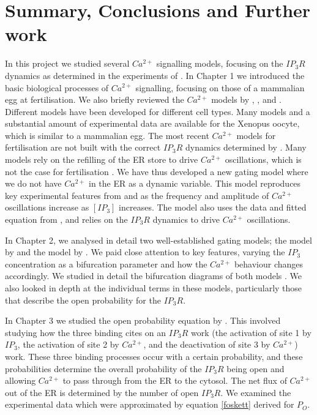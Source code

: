 \chapter{Summary, Conclusions and Further work}
In this project we studied several $Ca^{2+}$ signalling models, focusing on the $IP_3R$ dynamics as determined in the experiments of . In Chapter 1 we introduced the basic biological processes of $Ca^{2+}$ signalling, focusing on those of a mammalian egg at fertilisation. We also briefly reviewed the $Ca^{2+}$ models by , ,  and . Different models have been developed for different cell types. Many models and a substantial amount of experimental data are available for the Xenopus oocyte, which is similar to a mammalian egg. The most recent $Ca^{2+}$ models for fertilisation \cite{Theodoridou2013,Sanders2018,hofer} are not built with the correct $IP_3R$ dynamics determined by . Many models rely on the refilling of the ER store to drive $Ca^{2+}$ oscillations, which is not the case for fertilisation \cite{Sanders2018, wakai}. We have thus developed a new gating model where we do not have $Ca^{2+}$ in the ER as a dynamic variable. This model reproduces key experimental features from  and  as the frequency and amplitude of $Ca^{2+}$ oscillations increase as $[IP_3]$ increases. The model also uses the data and fitted equation from , and relies on the $IP_3R$ dynamics to drive $Ca^{2+}$ oscillations.  

In Chapter 2, we analysed in detail two well-established gating models; the model by  and the model by . We paid close attention to key features, varying the $IP_3$ concentration as a bifurcation parameter and how the $Ca^{2+}$ behaviour changes accordingly. We studied in detail the bifurcation diagrams of both models \cite{kaouri,lirinzel}. We also looked in depth at the individual terms in these models, particularly those that describe the open probability for the $IP_3R$.

In Chapter 3 we studied the open probability equation by . This involved studying how the three binding cites on an $IP_3R$ work (the activation of site 1 by $IP_3$, the activation of site 2 by $Ca^{2+}$, and the deactivation of site 3 by $Ca^{2+}$) work. These three binding processes occur with a certain probability, and these probabilities determine the overall probability of the $IP_3R$ being open and allowing $Ca^{2+}$ to pass through from the ER to the cytosol. The net flux of $Ca^{2+}$ out of the ER is determined by the number of open $IP_3R$. We examined the experimental data \cite{Mak1998} which were approximated by equation \eqref{foskett} derived for $P_O$. 

